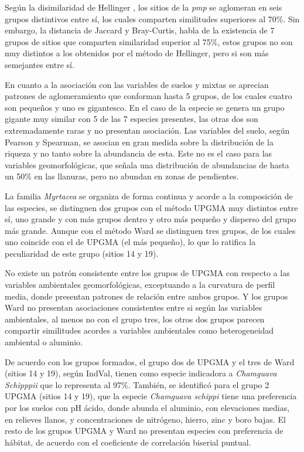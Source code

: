 \documentclass[11pt,]{article}
\begin{document}
Según la disimilaridad de Hellinger , los sitios de la \emph{pmp} se
aglomeran en seis grupos distintivos entre sí, los cuales comparten
similitudes superiores al 70\%. Sin embargo, la distancia de Jaccard y
Bray-Curtis, habla de la existencia de 7 grupos de sitios que comparten
similaridad superior al 75\%, estos grupos no son muy distintos a los
obtenidos por el método de Hellinger, pero si son más semejantes entre
sí.

En cuanto a la asociación con las variables de suelos y mixtas se
aprecian patrones de aglomeramiento que conforman hasta 5 grupos, de los
cuales cuatro son pequeños y uno es gigantesco. En el caso de la especie
se genera un grupo gigante muy similar con 5 de las 7 especies
presentes, las otras dos son extremadamente raras y no presentan
asociación. Las variables del suelo, según Pearson y Spearman, se
asocian en gran medida sobre la distribución de la riqueza y no tanto
sobre la abundancia de esta. Este no es el caso para las variables
geomorfológicas, que señala una distribución de abundancias de hasta un
50\% en las llanuras, pero no abundan en zonas de pendientes.

La familia \emph{Myrtacea} se organiza de forma continua y acorde a la
composición de las especies, se distinguen dos grupos con el método
UPGMA muy distintos entre sí, uno grande y con más grupos dentro y otro
más pequeño y disperso del grupo más grande. Aunque con el método Ward
se distinguen tres grupos, de los cuales uno coincide con el de UPGMA
(el más pequeño), lo que lo ratifica la peculiaridad de este grupo
(sitios 14 y 19).

No existe un patrón consistente entre los grupos de UPGMA con respecto a
las variables ambientales geomorfológicas, exceptuando a la curvatura de
perfil media, donde presentan patrones de relación entre ambos grupos. Y
los grupos Ward no presentan asociaciones consistentes entre si según
las variables ambientales, al menos no con el grupo tres, los otros dos
grupos parecen compartir similitudes acordes a variables ambientales
como heterogeneidad ambiental o aluminio.

De acuerdo con los grupos formados, el grupo dos de UPGMA y el tres de
Ward (sitios 14 y 19), según IndVal, tienen como especie indicadora a
\emph{Chamguava Schipppii} que lo representa al 97\%. También, se
identificó para el grupo 2 UPGMA (sitios 14 y 19), que la especie
\emph{Chamguava schippi} tiene una preferencia por los suelos con pH
ácido, donde abunda el aluminio, con elevaciones medias, en relieves
llanos, y concentraciones de nitrógeno, hierro, zinc y boro bajas. El
resto de los grupos UPGMA y Ward no presentan especies con preferencia
de hábitat, de acuerdo con el coeficiente de correlación biserial
puntual.
\end{document}
